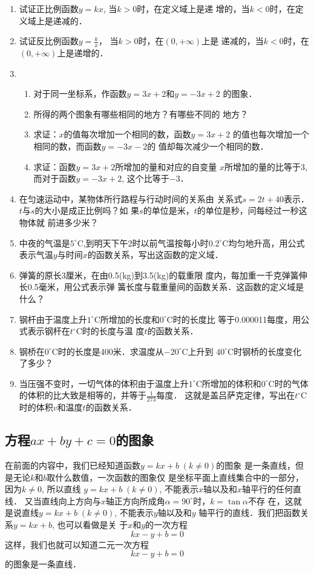 \begin{enumerate}
\item 试证正比例函数$y=kx$, 当$k>0$时，在定义域上是递
增的，当$k<0$时，在定义域上是递减的．

\item 试证反比例函数$y=\frac{k}{x}$，
当$k>0$时，在$(0,+\infty)$上是
递减的，当$k<0$时，在$(0,+\infty)$上是递增的．
\item  \begin{enumerate}
    \item 对于同一坐标系，作函数$y=3x+2$和$y=-3x+2$
的图象．
\item 所得的两个图象有哪些相同的地方？有哪些不同的
地方？
\item 求证：$x$的值每次增加一个相同的数，函数$y=3x+2$
的值也每次增加一个相同的数，而函数$y=-3x-2$的
值却每次减少一个相同的数．
\item 求证：函数$y=3x+2$所增加的量和对应的自变量
$x$所增加的量的比等于3, 而对于函数$y=-3x+2$,
这个比等于$-3$．
\end{enumerate} 

\item 
在匀速运动中，某物体所行路程与行动时间的关系由
关系式$s=2t+40$表示．$t$与$s$的大小是成正比例吗？如
果$s$的单位是米，$t$的单位是秒，问每经过一秒这物体就
前进多少米？
\item 
中夜的气温是$5^{\circ}$C,到明天下午2时以前气温按每小时$0.2^{\circ}$C均匀地升高，用公式表示气温$y$与时间$x$的函数关系，写出这函数的定义域．

\item 弹簧的原长3厘米，在由0.5(kg)到3.5(kg)的载重限
度内，每加重一千克弹簧伸长0.5毫米，用公式表示弹
簧长度与载重量间的函数关系．这函数的定义域是什么？
\item 钢杆由于温度上升$1^{\circ}$C所增加的长度和$0^{\circ}$C时的长度比
等于0.000011每度，用公式表示钢杆在$t^{\circ}$C时的长度与温
度$t$的函数关系．
\item 钢桥在$0^{\circ}$C时的长度是400米．求温度从$-20^{\circ}$C上升到
$40^{\circ}$C时钢桥的长度变化了多少？
\item 当压强不变时，一切气体的体积由于温度上升$1^{\circ}$C所增加的体积和$0^{\circ}$C时的气体的体积的比大致是相等的，并等于$\frac{1}{273}$每度．
这就是盖吕萨克定律，写出在$t^{\circ}$C时的体积$v$和温度$t$的函数关系．

\end{enumerate}

\subsection{方程$ax+by+c=0$的图象}
在前面的内容中，我们已经知道函数$y=kx+b\; (k\ne 0)$的图象
是一条直线，但是无论$k$和$b$取什么数值，一次函数的图象仅
是坐标平面上直线集合中的一部分，因为$k\ne 0$, 所以直线
$y=kx+b\; (k\ne 0)$, 不能表示$x$轴以及和$x$轴平行的任何直线．
又当直线向上方向与$x$轴正方向所成角$\alpha=90^{\circ}$时，$k=\tan\alpha$不存
在，这就是说直线$y=kx+b\; (k\ne 0)$, 不能表示$y$轴以及和$y$
轴平行的直线．我们把函数关系$y=kx+b$, 也可以看做是关
于$x$和$y$的一次方程
\[kx-y+b=0\]
这样，我们也就可以知道二元一次方程
\[kx-y+b=0\]
的图象是一条直线．

